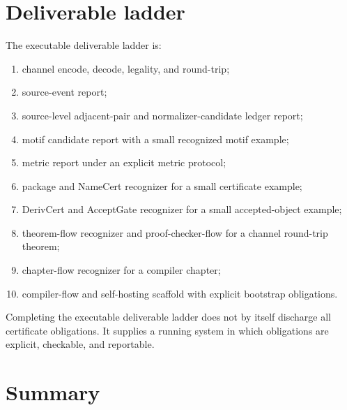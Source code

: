 \section{Deliverable ladder}
\label{sec:programmatic-deliverable-ladder}

\begin{definition}
\label{def:programmatic-executable-deliverable-ladder}
The executable deliverable ladder is:
\begin{enumerate}
\item channel encode, decode, legality, and round-trip;
\item source-event report;
\item source-level adjacent-pair and normalizer-candidate ledger report;
\item motif candidate report with a small recognized motif example;
\item metric report under an explicit metric protocol;
\item package and NameCert recognizer for a small certificate example;
\item DerivCert and AcceptGate recognizer for a small accepted-object example;
\item theorem-flow recognizer and proof-checker-flow for a channel round-trip theorem;
\item chapter-flow recognizer for a compiler chapter;
\item compiler-flow and self-hosting scaffold with explicit bootstrap obligations.
\end{enumerate}
\end{definition}

\begin{principle}
\label{prin:programmatic-executable-not-certificate-complete}
Completing the executable deliverable ladder does not by itself discharge all certificate obligations. It supplies a running system in which obligations are explicit, checkable, and reportable.
\end{principle}

\section{Summary}
\label{sec:programmatic-realization-summary}

